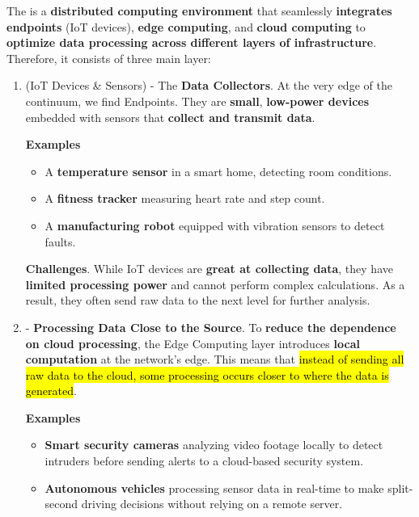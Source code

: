 The  is a \textbf{distributed computing environment} that seamlessly \textbf{integrates endpoints} (IoT devices), \textbf{edge computing}, and \textbf{cloud computing} to \textbf{optimize data processing across different layers of infrastructure}. Therefore, it consists of three main layer:
\begin{enumerate}
    \item {} (IoT Devices \& Sensors) - The \textbf{Data Collectors}. At the very edge of the continuum, we find Endpoints. They are \textbf{small}, \textbf{low-power devices} embedded with sensors that \textbf{collect and transmit data}.
    
    \textcolor{Green3}{ \textbf{Examples}}
    \begin{itemize}
        \item A \textbf{temperature sensor} in a smart home, detecting room conditions.
        \item A \textbf{fitness tracker} measuring heart rate and step count.
        \item A \textbf{manufacturing robot} equipped with vibration sensors to detect faults.
    \end{itemize}

    \textcolor{Red2}{ \textbf{Challenges}}. While IoT devices are \textbf{great at collecting data}, they have \textbf{limited processing power} and cannot perform complex calculations. As a result, they often send raw data to the next level for further analysis.


    \item {} - \textbf{Processing Data Close to the Source}. To \textbf{reduce the dependence on cloud processing}, the Edge Computing layer introduces \textbf{local computation} at the network's edge. This means that \hl{instead of sending all raw data to the cloud, some processing occurs closer to where the data is generated}.
    
    \textcolor{Green3}{ \textbf{Examples}}
    \begin{itemize}
        \item \textbf{Smart security cameras} analyzing video footage locally to detect intruders before sending alerts to a cloud-based security system.  
        \item \textbf{Autonomous vehicles} processing sensor data in real-time to make split-second driving decisions without relying on a remote server.  
    \end{itemize}


\end{enumerate}
